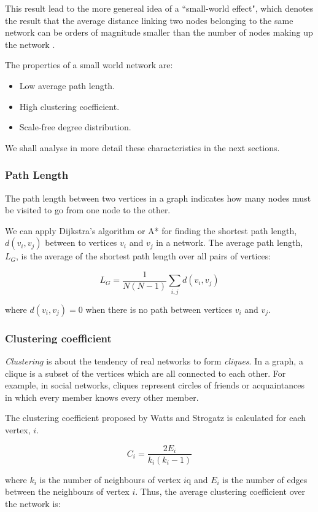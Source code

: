 \documentclass[a4paper,11pt,titlepage]{article}
\begin{document}
This result lead to the more genereal idea of a ``small-world effect", which
denotes the result that the average distance linking two nodes belonging to the
same network can be orders of magnitude smaller than the number of nodes making
up the network \cite{complexAdapt}.

The properties of a small world network are:

\begin{itemize}
\item Low average path length.
\item High clustering coefficient.
\item Scale-free degree distribution.
\end{itemize}

We shall analyse in more detail these characteristics in the next sections.

\subsubsection{Path Length}

The path length between two vertices in a graph indicates how many nodes must be
visited to go from one node to the other.

We can apply Dijkstra's algorithm or A* for finding the shortest path length,
$d(v_i, v_j)$ between to vertices $v_i$ and $v_j$ in a network.  The average
path length, $L_G$, is the average of the shortest path length over all pairs of
vertices:

\[ L_G = \frac{1}{N(N-1)} \sum_{i, j} d(v_i, v_j) \]

where $d(v_i, v_j) = 0$ when there is no path between vertices $v_i$ and $v_j$.

\subsubsection{Clustering coefficient}

\emph{Clustering} is about the tendency of real networks to form
\emph{cliques}. In a graph, a clique is a subset of the vertices which are all
connected to each other. For example, in social networks, cliques represent
circles of friends or acquaintances in which every member knows every other
member.

The clustering coefficient proposed by Watts and Strogatz is calculated for each
vertex, $i$.

\[ C_i = \frac{2E_i}{k_i(k_i-1)} \]

where $k_i$ is the number of neighbours of vertex $i$q and $E_i$ is the number
of edges between the neighbours of vertex $i$. Thus, the average clustering
coefficient over the network is:
\end{document}
